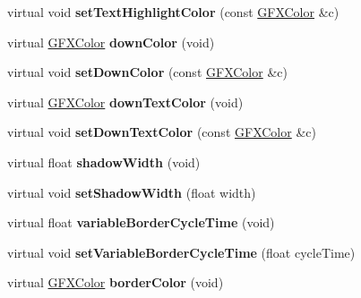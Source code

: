 \begin{DoxyCompactItemize}
\item 
virtual void {\bfseries set\+Text\+Highlight\+Color} (const \hyperlink{structGFXColor}{G\+F\+X\+Color} \&c)\hypertarget{classNewButton_ac33caca7a85ff47462d33095e57c6a47}{}\label{classNewButton_ac33caca7a85ff47462d33095e57c6a47}

\item 
virtual \hyperlink{structGFXColor}{G\+F\+X\+Color} {\bfseries down\+Color} (void)\hypertarget{classNewButton_a16c34b5e35dba1abc63954c06ae9a158}{}\label{classNewButton_a16c34b5e35dba1abc63954c06ae9a158}

\item 
virtual void {\bfseries set\+Down\+Color} (const \hyperlink{structGFXColor}{G\+F\+X\+Color} \&c)\hypertarget{classNewButton_ada32b09219767de04dfff62d5be4a535}{}\label{classNewButton_ada32b09219767de04dfff62d5be4a535}

\item 
virtual \hyperlink{structGFXColor}{G\+F\+X\+Color} {\bfseries down\+Text\+Color} (void)\hypertarget{classNewButton_a6bbd6c669d9cdb2184abc56a9941f40e}{}\label{classNewButton_a6bbd6c669d9cdb2184abc56a9941f40e}

\item 
virtual void {\bfseries set\+Down\+Text\+Color} (const \hyperlink{structGFXColor}{G\+F\+X\+Color} \&c)\hypertarget{classNewButton_aa42612b12cd71bd369cd096b3ab19ce0}{}\label{classNewButton_aa42612b12cd71bd369cd096b3ab19ce0}

\item 
virtual float {\bfseries shadow\+Width} (void)\hypertarget{classNewButton_a63730a56c220c6f88761b8b1b73f964b}{}\label{classNewButton_a63730a56c220c6f88761b8b1b73f964b}

\item 
virtual void {\bfseries set\+Shadow\+Width} (float width)\hypertarget{classNewButton_a1e2f2991ca780395bc3bd38ed912d9b1}{}\label{classNewButton_a1e2f2991ca780395bc3bd38ed912d9b1}

\item 
virtual float {\bfseries variable\+Border\+Cycle\+Time} (void)\hypertarget{classNewButton_a684d921b51e6ab4f860a1c0837eabc1b}{}\label{classNewButton_a684d921b51e6ab4f860a1c0837eabc1b}

\item 
virtual void {\bfseries set\+Variable\+Border\+Cycle\+Time} (float cycle\+Time)\hypertarget{classNewButton_a6fcb73ca152a118782bc7551cc492934}{}\label{classNewButton_a6fcb73ca152a118782bc7551cc492934}

\item 
virtual \hyperlink{structGFXColor}{G\+F\+X\+Color} {\bfseries border\+Color} (void)\hypertarget{classNewButton_af79693c254678158ac4df511e004e987}{}\label{classNewButton_af79693c254678158ac4df511e004e987}


\end{DoxyCompactItemize}
